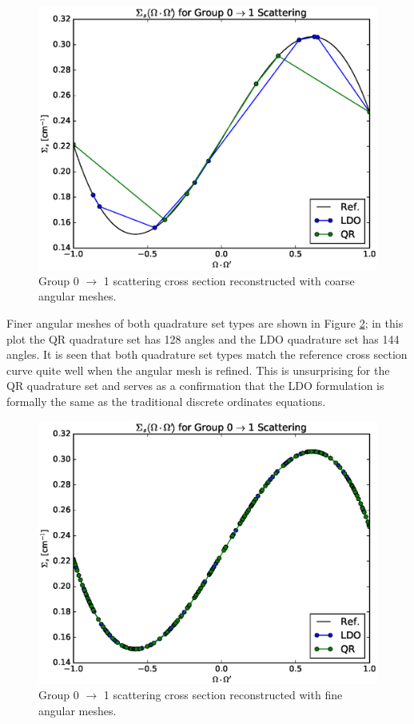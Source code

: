 \begin{figure}[!htb]
\centering
\includegraphics[width=\textwidth]{img/xs-coarse.eps}
\caption{Group 0 $\to$ 1 scattering cross section reconstructed with coarse angular meshes.}
\label{fig:water-xs-coarse}
\end{figure}
\FloatBarrier

Finer angular meshes of both quadrature set types are shown in Figure 
\ref{fig:water-xs-fine}; in this plot the QR quadrature set has 128 angles and the LDO 
quadrature set has 144 angles.
It is seen that both quadrature set types match the reference
cross section curve quite well when the angular mesh is refined. This is unsurprising
for the QR quadrature set and serves as a confirmation that the LDO formulation is 
formally the same as the traditional discrete ordinates equations.

\begin{figure}[!htb]
\centering
\includegraphics[width=\textwidth]{img/xs-fine.eps}
\caption{Group 0 $\to$ 1 scattering cross section reconstructed with fine angular meshes.}
\label{fig:water-xs-fine}
\end{figure}

